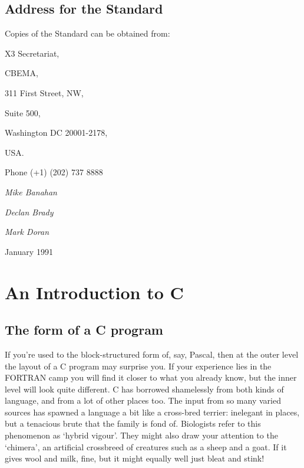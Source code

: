  
        \section*{Address for the Standard}
        

  

  Copies of the Standard can be obtained from:


  

   X3 Secretariat,

   CBEMA,

   311 First Street, NW,

   Suite 500,

   Washington DC 20001-2178,

   USA.

   Phone (+1) (202) 737 8888
  


  
   \begin{center}\textit{Mike Banahan}\end{center}



   \begin{center}\textit{Declan Brady}\end{center}



   \begin{center}\textit{Mark Doran}\end{center}



   

   January 1991
  

 \chapter{An Introduction to C}


        \section{The form of a C program}
        

  

  If you're used to the block-structured form of, say, Pascal, then at the
   outer level the layout of a C program may surprise you. If your experience
   lies in the FORTRAN camp you will find it closer to what you already know,
   but the inner level will look quite different. C has borrowed shamelessly
   from both kinds of language, and from a lot of other places too. The input
   from so many varied sources has spawned a language a bit like a cross-bred
   terrier: inelegant in places, but a tenacious brute that the family is fond
   of.  Biologists refer to this phenomenon as `hybrid vigour'. They
   might also draw your attention to the `chimera', an artificial
   crossbreed of creatures such as a sheep and a goat. If it gives wool and
   milk, fine, but it might equally well just bleat and stink!


